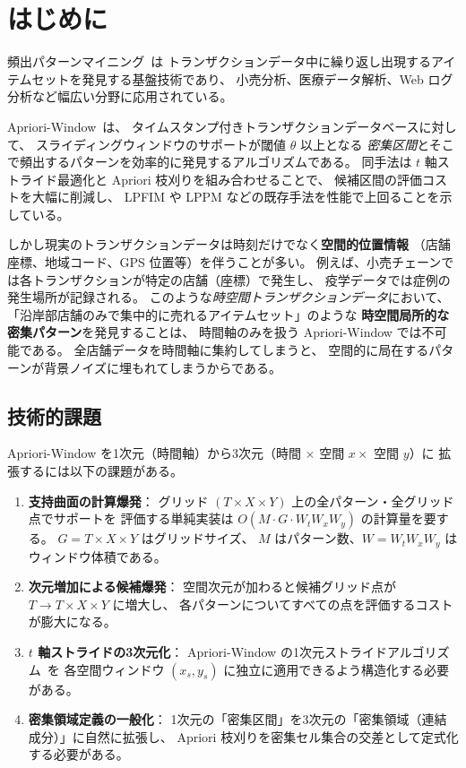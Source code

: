 \section{はじめに}\label{sec:intro}

頻出パターンマイニング~\cite{agrawal1994apriori,han2000mining}は
トランザクションデータ中に繰り返し出現するアイテムセットを発見する基盤技術であり、
小売分析、医療データ解析、Web ログ分析など幅広い分野に応用されている。

Apriori-Window~\cite{aprioriwindow}は、
タイムスタンプ付きトランザクションデータベースに対して、
スライディングウィンドウのサポートが閾値 $\theta$ 以上となる
\emph{密集区間}とそこで頻出するパターンを効率的に発見するアルゴリズムである。
同手法は $t$ 軸ストライド最適化と Apriori 枝刈りを組み合わせることで、
候補区間の評価コストを大幅に削減し、
LPFIM や LPPM などの既存手法を性能で上回ることを示している。

しかし現実のトランザクションデータは時刻だけでなく\textbf{空間的位置情報}
（店舗座標、地域コード、GPS 位置等）を伴うことが多い。
例えば、小売チェーンでは各トランザクションが特定の店舗（座標）で発生し、
疫学データでは症例の発生場所が記録される。
このような\emph{時空間トランザクションデータ}において、
「沿岸部店舗のみで集中的に売れるアイテムセット」のような
\textbf{時空間局所的な密集パターン}を発見することは、
時間軸のみを扱う Apriori-Window では不可能である。
全店舗データを時間軸に集約してしまうと、
空間的に局在するパターンが背景ノイズに埋もれてしまうからである。

\subsection{技術的課題}

Apriori-Window を1次元（時間軸）から3次元（時間 $\times$ 空間 $x \times$ 空間 $y$）に
拡張するには以下の課題がある。

\begin{enumerate}
\item \textbf{支持曲面の計算爆発}：
グリッド $(T \times X \times Y)$ 上の全パターン・全グリッド点でサポートを
評価する単純実装は $O(M \cdot G \cdot W_t W_x W_y)$ の計算量を要する。
$G = T \times X \times Y$ はグリッドサイズ、
$M$ はパターン数、$W = W_t W_x W_y$ はウィンドウ体積である。

\item \textbf{次元増加による候補爆発}：
空間次元が加わると候補グリッド点が $T \to T \times X \times Y$ に増大し、
各パターンについてすべての点を評価するコストが膨大になる。

\item \textbf{$t$ 軸ストライドの3次元化}：
Apriori-Window の1次元ストライドアルゴリズム~\cite{aprioriwindow}を
各空間ウィンドウ $(x_s, y_s)$ に独立に適用できるよう構造化する必要がある。

\item \textbf{密集領域定義の一般化}：
1次元の「密集区間」を3次元の「密集領域（連結成分）」に自然に拡張し、
Apriori 枝刈りを密集セル集合の交差として定式化する必要がある。
\end{enumerate}

